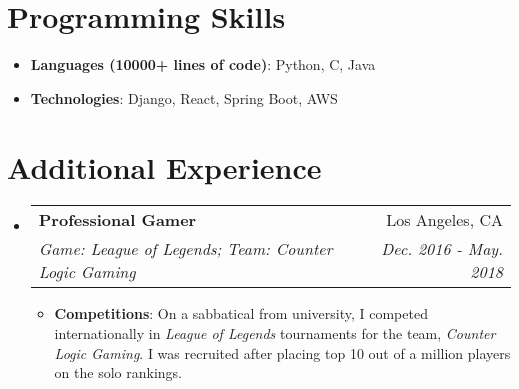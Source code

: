 \documentclass[letterpaper,11pt]{article}
\makeatletter
\newcommand{\resumeItem}[2]{
  \item\small{
    \textbf{#1}{: #2 \vspace{-2pt}}
  }
}
\newcommand{\resumeSubheading}[4]{
  \vspace{-1pt}\item
    \begin{tabular*}{0.97\textwidth}[t]{l@{\extracolsep{\fill}}r}
      \textbf{#1} & #2 \\
      \textit{\small#3} & \textit{\small #4} \\
    \end{tabular*}\vspace{-5pt}
}
\newcommand{\resumeSubItem}[2]{\resumeItem{#1}{#2}\vspace{-4pt}}
\newcommand{\resumeSubHeadingListStart}{\begin{itemize}[leftmargin=*]}
\newcommand{\resumeSubHeadingListEnd}{\end{itemize}}
\newcommand{\resumeItemListStart}{\begin{itemize}}
\newcommand{\resumeItemListEnd}{\end{itemize}\vspace{-5pt}}
\makeatother
\begin{document}
\section{Programming Skills}
  \resumeSubHeadingListStart
    \resumeSubItem{Languages (10000+ lines of code)}
      {Python, C, Java}
    \resumeSubItem{Technologies}
      {Django, React, Spring Boot, AWS}
  \resumeSubHeadingListEnd



\section{Additional Experience}
  \resumeSubHeadingListStart
    \resumeSubheading
      {Professional Gamer}{Los Angeles, CA}
      {Game: League of Legends; Team: Counter Logic Gaming}{Dec. 2016 - May. 2018}
      \resumeItemListStart
        \resumeItem{Competitions}
          {On a sabbatical from university, I competed internationally in
          \textit{League of Legends} tournaments for the team, \textit{Counter
          Logic Gaming}. I was recruited after placing top 10 out of a million
          players on the solo rankings.}
      \resumeItemListEnd
      \vspace{-5pt}
  \resumeSubHeadingListEnd
\end{document}
